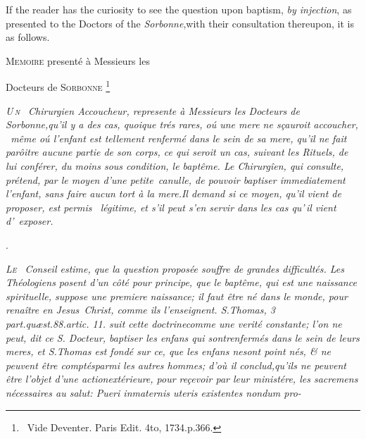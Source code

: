 \documentclass{article}
\begin{document}
\bigskip

\bgroup\fontsize{8}{11}\selectfont
If the reader has
the curiosity to see the question upon baptism, \textit{by injection}, as presented
to the Doctors of the \textit{Sorbonne},\tsk with their consultation thereupon, it is as
follows.\par\egroup\eject

\centerline{\textsc{Memoire} presenté à Messieurs les}
\centerline{Docteurs de \textsc{Sorbonne} \footnote{\ Vide Deventer. Paris Edit. 4to,
1734.\@ p.\@ 366.}}

\lettrine{\itshape U\,}{\itshape n\ }\bgroup\itshape\small\setlength{\baselineskip}{13pt}%
Chirurgien Accoucheur,
represente à Messieurs les Docteurs de
\hbox{\upshape Sorbonne},\break qu’il y a des cas, quoique
trés rares, oú une mere ne sçauroit accoucher, \et\
même oú l’enfant est tellement renfermé
dans le sein de sa mere, qu’il ne fait parôitre aucune
partie de son corps, ce qui seroit un cas, suivant les Rituels, de
lui conférer, du moins sous condition, le baptême. Le
Chirurgîen, qui consulte, prétend, par le moyen
d’une \hbox{\upshape petite canulle,} de pouvoir baptiser
immediatement l’enfant, sans faire aucun tort à la
mere.\tsh  Il demand si ce moyen, qu’il vient de
proposer, est permis \et\ légitime, et s’il peut
s’en servir dans les cas qu’\,il vient
d’~exposer.\egroup

\newpage
\centerline{.}

\lettrine{\itshape L}{\itshape e\ }\bgroup\fontsize{9}{13}\selectfont\itshape
Conseil estime, que la question proposée souffre de
grandes difficultés. Les Théo\-logiens posent d’un côté pour principe, que
le baptême, qui est une naissance spirituelle,
suppose une premiere naissance; il faut être né
dans le monde, pour renaître en \hbox{\upshape Jesus Christ},
comme ils l’enseignent. S.\@ {\upshape Thomas, 3 part.\break quæst.\@ 88.\@ artic.\@
11.\@} suit cette doctrine\break comme une verité constante; l’on ne peut, dit ce S.
Docteur, baptiser les enfans qui sont\break renfermés dans le sein de leurs meres,
et S.\break \hbox{\upshape Thomas} est fondé sur ce, que les enfans ne\break sont
point nés, \& ne peuvent être comptés\break parmi les autres hommes; d’où il
conclud,\break qu’ils ne peuvent être l’objet d’une action\break extérieure, pour
reçevoir par leur ministére, les sacremens nécessaires au salut: 
\fontsize{10}{13}\selectfont\upshape
Pueri
in\break maternis uteris existentes nondum pro-\break
{}
\egroup
\end{document}
